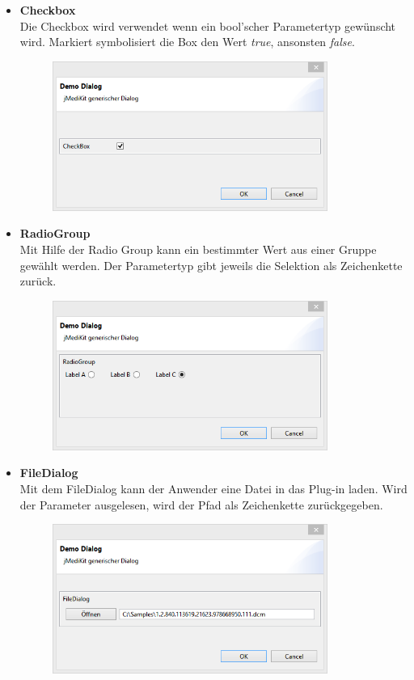 \begin{itemize}
\item \textbf{Checkbox}\\
Die Checkbox wird verwendet wenn ein bool'scher Parametertyp gewünscht wird. Markiert symbolisiert die Box den Wert \textit{true}, ansonsten \textit{false}.
\begin{figure}[H]
\includegraphics[angle=0,width=9cm]{./img/checkbox.png}
\end{figure}

\item \textbf{RadioGroup}\\
Mit Hilfe der Radio Group kann ein bestimmter Wert aus einer Gruppe gewählt werden. Der Parametertyp gibt jeweils die Selektion als Zeichenkette zurück.
\begin{figure}[H]
\includegraphics[angle=0,width=9cm]{./img/radiogroup.png}
\end{figure}

\item \textbf{FileDialog}\\
Mit dem FileDialog kann der Anwender eine Datei in das Plug-in laden. Wird der Parameter ausgelesen, wird der Pfad als Zeichenkette zurückgegeben.
\begin{figure}[H]
\includegraphics[angle=0,width=9cm]{./img/filedialog.png}
\end{figure}


\end{itemize}

